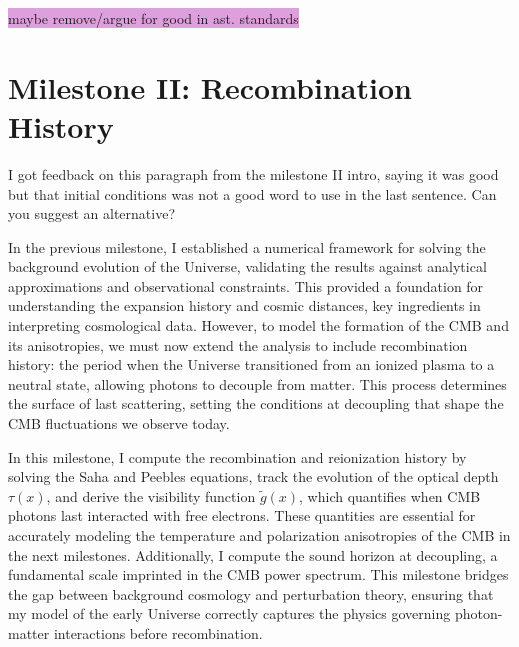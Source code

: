 \documentclass{aa}
\numberwithin{equation}{section}
\numberwithin{table}{section}
\numberwithin{figure}{section}
\begin{document}
\colorbox{Plum}{maybe remove/argue for good in ast. standards}




\section{Milestone II: Recombination History}\label{sec: milestone II}
I got feedback on this paragraph from the milestone II intro, saying it was good but that initial conditions was not a good word to use in the last sentence. Can you suggest an alternative?

In the previous milestone, I established a numerical framework for solving the background evolution of the Universe, validating the results against analytical approximations and observational constraints. This provided a foundation for understanding the expansion history and cosmic distances, key ingredients in interpreting cosmological data. However, to model the formation of the CMB and its anisotropies, we must now extend the analysis to include recombination history: the period when the Universe transitioned from an ionized plasma to a neutral state, allowing photons to decouple from matter. This process determines the surface of last scattering, setting the conditions at decoupling that shape the CMB fluctuations we observe today.  

In this milestone, I compute the recombination and reionization history by solving the Saha and Peebles equations, track the evolution of the optical depth $\tau(x)$, and derive the visibility function $\tilde{g}(x)$, which quantifies when CMB photons last interacted with free electrons. These quantities are essential for accurately modeling the temperature and polarization anisotropies of the CMB in the next milestones. Additionally, I compute the sound horizon at decoupling, a fundamental scale imprinted in the CMB power spectrum. This milestone bridges the gap between background cosmology and perturbation theory, ensuring that my model of the early Universe correctly captures the physics governing photon-matter interactions before recombination. 
\end{document}
